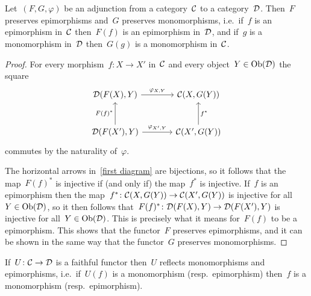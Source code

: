 \section{}




\subsection{}

\begin{lemma}
  \label{adjoint mono epi}
  Let~$(F, G, \varphi)$ be an adjunction from a category~$\mathcal{C}$ to a category~$\mathcal{D}$.
  Then~$F$ preserves epimorphisms and~$G$ preserves monomorphisms, i.e.\ if~$f$ is an epimorphism in~$\mathcal{C}$ then~$F(f)$ is an epimorphism in~$\mathcal{D}$, and if~$g$ is a monomorphism in~$\mathcal{D}$ then~$G(g)$ is a monomorphism in~$\mathcal{C}$.
\end{lemma}

\begin{proof}
      For every morphism~$f \colon X \to X'$ in~$\mathcal{C}$ and every object~$Y \in \operatorname{Ob}(\mathcal{D})$ the square
      \begin{equation}
        \label{first diagram}
        \begin{tikzcd}[sep = large]
            \Dcat(F(X), Y)
            \arrow{r}[above]{\varphi_{X,Y}}
          & \Ccat(X, G(Y))
          \\
            \Dcat(F(X'), Y)
            \arrow{u}[left]{F(f)^*}
            \arrow{r}[above]{\varphi_{X',Y}}
          & \Ccat(X', G(Y))
            \arrow{u}[right]{f^*}
        \end{tikzcd}
      \end{equation}
      commutes by the naturality of~$\varphi$.
      
      The horizontal arrows in~\eqref{first diagram} are bijections, so it follows that the map~$F(f)^*$ is injective if (and only if) the map~$f^*$ is injective.
      If~$f$ is an epimorphism then the map~$f^* \colon \mathcal{C}(X, G(Y)) \to \mathcal{C}(X', G(Y))$ is injective for all~$Y \in \operatorname{Ob}(\mathcal{D})$, so it then follows that~$F(f)^* \colon \mathcal{D}(F(X), Y) \to \mathcal{D}(F(X'), Y)$ is injective for all~$Y \in \operatorname{Ob}(\mathcal{D})$.
      This is precisely what it means for~$F(f)$ to be a epimorphism.
      This shows that the functor~$F$ preserves epimorphisms, and it can be shown in the same way that the functor~$G$ preserves monomorphisms.
\end{proof}


\begin{lemma}
  If~$U \colon \mathcal{C} \to \mathcal{D}$ is a faithful functor then~$U$ reflects monomorphisms and epimorphisms, i.e.\ if~$U(f)$ is a monomorphism (resp.\ epimorphism) then~$f$ is a monomorphism (resp.\ epimorphism).
\end{lemma}


